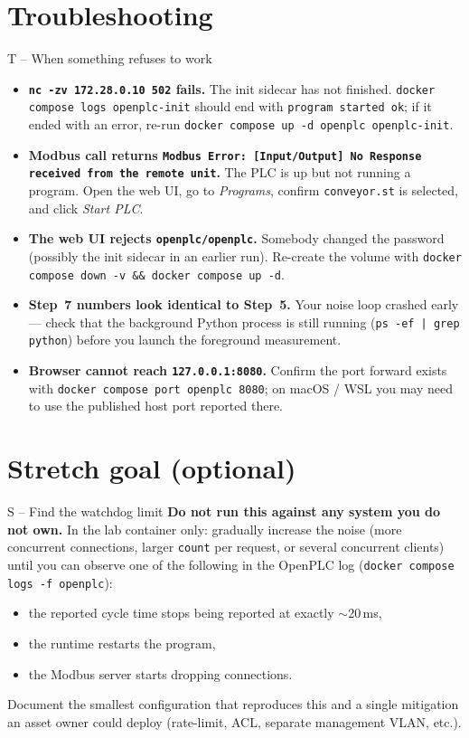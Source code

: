 \documentclass[11pt,a4paper]{article}
\begin{document}
\section*{Troubleshooting}

\begin{stepbox}{T -- When something refuses to work}
\begin{itemize}\setlength{\itemsep}{2pt}
  \item \textbf{\texttt{nc -zv 172.28.0.10 502} fails.} The init sidecar has not finished. \texttt{docker compose logs openplc-init} should end with \texttt{program started ok}; if it ended with an error, re-run \texttt{docker compose up -d openplc openplc-init}.
  \item \textbf{Modbus call returns \texttt{Modbus Error: [Input/Output] No Response received from the remote unit}.} The PLC is up but not running a program. Open the web UI, go to \emph{Programs}, confirm \texttt{conveyor.st} is selected, and click \emph{Start PLC}.
  \item \textbf{The web UI rejects \texttt{openplc/openplc}.} Somebody changed the password (possibly the init sidecar in an earlier run). Re-create the volume with \texttt{docker compose down -v \&\& docker compose up -d}.
  \item \textbf{Step~7 numbers look identical to Step~5.} Your noise loop crashed early --- check that the background Python process is still running (\texttt{ps -ef | grep python}) before you launch the foreground measurement.
  \item \textbf{Browser cannot reach \texttt{127.0.0.1:8080}.} Confirm the port forward exists with \texttt{docker compose port openplc 8080}; on macOS / WSL you may need to use the published host port reported there.
\end{itemize}
\end{stepbox}

\section*{Stretch goal (optional)}

\begin{stepbox}{S -- Find the watchdog limit}
\textbf{Do not run this against any system you do not own.} In the lab container only: gradually increase the noise (more concurrent connections, larger \texttt{count} per request, or several concurrent clients) until you can observe one of the following in the OpenPLC log (\texttt{docker compose logs -f openplc}):
\begin{itemize}\setlength{\itemsep}{1pt}
  \item the reported cycle time stops being reported at exactly $\sim$20\,ms,
  \item the runtime restarts the program,
  \item the Modbus server starts dropping connections.
\end{itemize}
Document the smallest configuration that reproduces this and a single mitigation an asset owner could deploy (rate-limit, ACL, separate management VLAN, etc.).
\end{stepbox}
\end{document}
